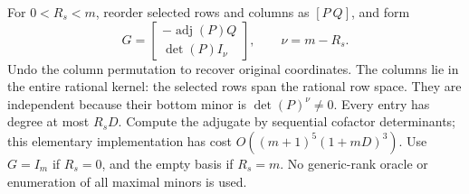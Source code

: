 \documentclass[11pt]{article}
\theoremstyle{remark}\newtheorem{remark}[theorem]{Remark}
\begin{document}
For $0<R_s<m$, reorder selected rows and columns as $[P\ Q]$, and form
\begin{equation}\label{eq:kernelbasis}
 G=\begin{bmatrix}-\operatorname{adj}(P)Q\\\det(P)I_\nu\end{bmatrix},
 \qquad \nu=m-R_s.
\end{equation}
Undo the column permutation to recover original coordinates. The columns lie in the entire rational kernel: the selected rows span the rational row space. They are independent because their bottom minor is $\det(P)^\nu\ne0$. Every entry has degree at most $R_sD$. Compute the adjugate by sequential cofactor determinants; this elementary implementation has cost $O((m+1)^5(1+mD)^3)$. Use $G=I_m$ if $R_s=0$, and the empty basis if $R_s=m$. No generic-rank oracle or enumeration of all maximal minors is used.
\end{document}
